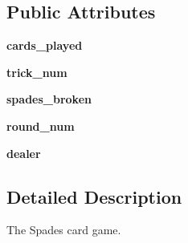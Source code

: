 \subsection*{Public Attributes}
\begin{DoxyCompactItemize}
\item 
\hypertarget{classcards-with-friends_1_1games_1_1spades_1_1_spades_a76ac0333f36b14b5fee950739b538676}{{\bfseries cards\-\_\-played}}\label{classcards-with-friends_1_1games_1_1spades_1_1_spades_a76ac0333f36b14b5fee950739b538676}

\item 
\hypertarget{classcards-with-friends_1_1games_1_1spades_1_1_spades_aca06f02693cd5d784a31305551b3d97f}{{\bfseries trick\-\_\-num}}\label{classcards-with-friends_1_1games_1_1spades_1_1_spades_aca06f02693cd5d784a31305551b3d97f}

\item 
\hypertarget{classcards-with-friends_1_1games_1_1spades_1_1_spades_a44d3c372f922d1c1fc2110f0531d1f57}{{\bfseries spades\-\_\-broken}}\label{classcards-with-friends_1_1games_1_1spades_1_1_spades_a44d3c372f922d1c1fc2110f0531d1f57}

\item 
\hypertarget{classcards-with-friends_1_1games_1_1spades_1_1_spades_a53aa57c30689ad752c41098d905debfc}{{\bfseries round\-\_\-num}}\label{classcards-with-friends_1_1games_1_1spades_1_1_spades_a53aa57c30689ad752c41098d905debfc}

\item 
\hypertarget{classcards-with-friends_1_1games_1_1spades_1_1_spades_a058680e817a07bd599fee2e9518b4464}{{\bfseries dealer}}\label{classcards-with-friends_1_1games_1_1spades_1_1_spades_a058680e817a07bd599fee2e9518b4464}

\end{DoxyCompactItemize}


\subsection{Detailed Description}
\begin{DoxyVerb}The Spades card game.\end{DoxyVerb}
 

